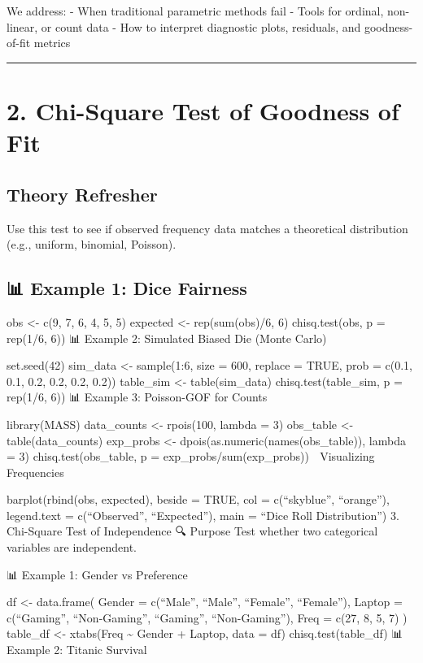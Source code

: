 \documentclass[
  letterpaper,
  DIV=11,
  numbers=noendperiod]{scrreprt}
\begin{document}
We address: - When traditional parametric methods fail - Tools for
ordinal, non-linear, or count data - How to interpret diagnostic plots,
residuals, and goodness-of-fit metrics

\begin{center}\rule{0.5\linewidth}{0.5pt}\end{center}

\section{2. Chi-Square Test of Goodness of
Fit}\label{chi-square-test-of-goodness-of-fit}

\subsection{Theory Refresher}\label{theory-refresher-1}

Use this test to see if observed frequency data matches a theoretical
distribution (e.g., uniform, binomial, Poisson).

\subsection{📊 Example 1: Dice Fairness}\label{example-1-dice-fairness}

obs \textless- c(9, 7, 6, 4, 5, 5) expected \textless- rep(sum(obs)/6,
6) chisq.test(obs, p = rep(1/6, 6)) 📊 Example 2: Simulated Biased Die
(Monte Carlo)

set.seed(42) sim\_data \textless- sample(1:6, size = 600, replace =
TRUE, prob = c(0.1, 0.1, 0.2, 0.2, 0.2, 0.2)) table\_sim \textless-
table(sim\_data) chisq.test(table\_sim, p = rep(1/6, 6)) 📊 Example 3:
Poisson-GOF for Counts

library(MASS) data\_counts \textless- rpois(100, lambda = 3) obs\_table
\textless- table(data\_counts) exp\_probs \textless-
dpois(as.numeric(names(obs\_table)), lambda = 3) chisq.test(obs\_table,
p = exp\_probs/sum(exp\_probs)) 🎨 Visualizing Frequencies

barplot(rbind(obs, expected), beside = TRUE, col = c(``skyblue'',
``orange''), legend.text = c(``Observed'', ``Expected''), main = ``Dice
Roll Distribution'') 3. Chi-Square Test of Independence 🔍 Purpose Test
whether two categorical variables are independent.

📊 Example 1: Gender vs Preference

df \textless- data.frame( Gender = c(``Male'', ``Male'', ``Female'',
``Female''), Laptop = c(``Gaming'', ``Non-Gaming'', ``Gaming'',
``Non-Gaming''), Freq = c(27, 8, 5, 7) ) table\_df \textless- xtabs(Freq
\textasciitilde{} Gender + Laptop, data = df) chisq.test(table\_df) 📊
Example 2: Titanic Survival
\end{document}

